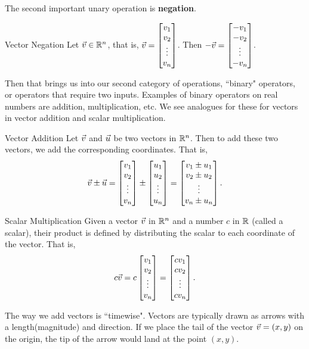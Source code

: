 The second important unary operation is \textbf{negation}. 

\begin{definition}{Vector Negation}
Let $\vec{v}\in\mathbb{R}^n$, that is, $\vec{v}=\begin{bmatrix}v_1\\v_2\\ \vdots \\ v_n\end{bmatrix}$. Then $-\vec{v}=\begin{bmatrix}-v_1\\-v_2\\ \vdots \\ -v_n\end{bmatrix}$.
\end{definition}

Then that brings us into our second category of operations, ``binary" operators, or operators that require two inputs. Examples of binary operators on real numbers are addition, multiplication, etc. We see analogues for these for vectors in vector addition and scalar multiplication.

\begin{definition}{Vector Addition}
Let $\vec{v}$ and $\vec{u}$ be two vectors in $\mathbb{R}^n$. Then to add these two vectors, we add the corresponding coordinates. That is,
$$\vec{v}\pm \vec{u}=\begin{bmatrix}v_1\\v_2\\ \vdots\\v_n\end{bmatrix}\pm\begin{bmatrix}u_1\\u_2\\ \vdots\\u_n\end{bmatrix}=\begin{bmatrix}v_1\pm u_1\\v_2\pm u_2\\ \vdots\\v_n\pm u_n\end{bmatrix}. $$
\end{definition}

\begin{definition}{Scalar Multiplication}
Given a vector $\vec{v}$ in $\mathbb{R}^n$ and a number $c$ in $\mathbb{R}$ (called a scalar), their product is defined by distributing the scalar to each coordinate of the vector. That is,
$$c\vec{v}=c\begin{bmatrix}v_1\\v_2\\ \vdots\\v_n\end{bmatrix}=\begin{bmatrix}cv_1\\cv_2\\ \vdots \\ c v_n\end{bmatrix}.$$
\end{definition}

The way we add vectors is ``timewise". Vectors are typically drawn as arrows with a length(magnitude) and direction. If we place the tail of the vector $\vec{v}=(x,y)$ on the origin, the tip of the arrow would land at the point $(x,y)$. 

